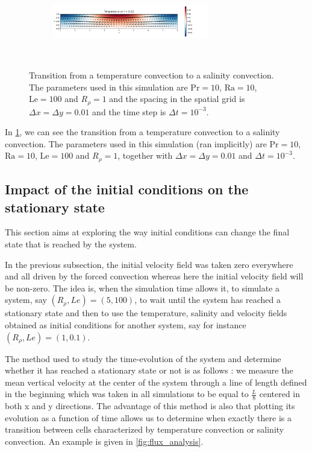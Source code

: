 \documentclass{article}
\def\Ra{\mathrm{Ra}}
\def\Pr{\mathrm{Pr}}
\def\Le{\mathrm{Le}}
\begin{document}
\begin{figure}[ht]
\begin{subfigure}{\textwidth}
  \end{subfigure}\\
  \begin{subfigure}{\textwidth}
    \centering
    \includegraphics[width=0.75\textwidth]{images/TS_6.pdf}
  \end{subfigure}\\
  \caption{Transition from a temperature convection to a salinity convection. The parameters used in this simulation are $\Pr = 10$, $\Ra = 10$, $\Le = 100$ and $R_{\rho} = 1$ and the spacing in the spatial grid is $\Delta x = \Delta y = 0.01$ and the time step is $\Delta t = 10^{-3}$.}
  \label{fig:changeTS}
\end{figure}

In \cref{fig:changeTS}, we can see the transition from a temperature convection to a salinity convection. The parameters used in this simulation (ran implicitly) are $\Pr = 10$, $\Ra = 10$, $\Le = 100$ and $R_{\rho} = 1$, together with $\Delta x = \Delta y = 0.01$ and $\Delta t = 10^{-3}$.

\subsection{Impact of the initial conditions on the stationary state}

This section aims at exploring the way initial conditions can change the final state that is reached by the system. 
\par
In the previous subsection, the initial velocity field was taken zero everywhere and all driven by the forced convection whereas here the initial velocity field will be non-zero. The idea is, when the simulation time allows it, to simulate a system, say $(R_{\rho},Le) = (5,100)$, to wait until the system has reached a stationary state and then to use the temperature, salinity and velocity fields obtained as initial conditions for another system, say for instance $(R_{\rho},Le) = (1,0.1)$. 
\par
The method used to study the time-evolution of the system and determine whether it has reached a stationary state or not is as follows : we measure the mean vertical velocity at the center of the system through a line of length defined in the beginning which was taken in all simulations to be equal to $\frac{L}{8}$ centered in both x and y directions. The advantage of this method is also that plotting its evolution as a function of time allows us to determine when exactly there is a transition between cells characterized by temperature convection or salinity convection. An example is given in \cref{fig:flux_analysis}.
\end{document}
